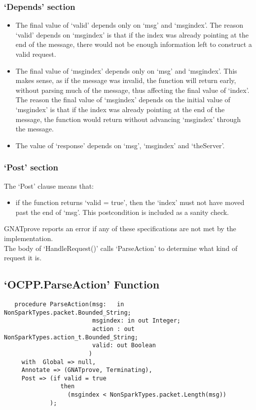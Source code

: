 \documentclass[12pt,openany,a4paper]{book}
\begin{document}
\subsubsection{`Depends' section}
\begin{itemize}
\item The final value of `valid' depends only on `msg' and `msgindex'. The reason `valid' depends on `msgindex' is that if the index was already pointing at the end of the message, there would not be enough information left to construct a valid request.
\item The final value of `msgindex' depends only on `msg' and `msgindex'. This makes sense, as if the message was invalid, the function will return early, without parsing much of the message, thus affecting the final value of `index'. The reason the final value of `msgindex' depends on the initial value of `msgindex' is that if the index was already pointing at the end of the message, the function would return without advancing `msgindex' through the message.
\item The value of `response' depends on `msg', `msgindex' and `theServer'. 
\end{itemize}
\subsubsection{`Post' section}
The `Post' clause means that:
\begin{itemize}
\item if the function returns `valid = true', then the `index' must not have moved past the end of `msg'. This postcondition is included as a sanity check. 
\end{itemize}

GNATprove reports an error if any of these specifications are not met by the implementation.\\


The body of `HandleRequest()' calls `ParseAction' to determine what kind of request it is.

\subsection{`OCPP.ParseAction' Function}
\begin{verbatim}
   procedure ParseAction(msg:   in  NonSparkTypes.packet.Bounded_String;
                         msgindex: in out Integer;
                         action : out NonSparkTypes.action_t.Bounded_String;
                         valid: out Boolean
                        )
     with  Global => null,
     Annotate => (GNATprove, Terminating),
     Post => (if valid = true 
                then 
                  (msgindex < NonSparkTypes.packet.Length(msg))
             );

   
\end{verbatim}
\end{document}
